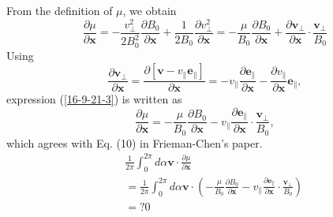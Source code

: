 \documentclass{article}
\begin{document}
From the definition of $\mu$, we obtain
\begin{equation}
  \label{16-9-21-3} \frac{\partial \mu}{\partial \mathbf{x}} = -
  \frac{v_{\perp}^2}{2 B^2_0} \frac{\partial B_0}{\partial \mathbf{x}} +
  \frac{1}{2 B_0}  \frac{\partial v_{\perp}^2}{\partial \mathbf{x}} = -
  \frac{\mu}{B_0}  \frac{\partial B_0}{\partial \mathbf{x}} + \frac{\partial
  \mathbf{v}_{\perp}}{\partial \mathbf{x}} \cdot
  \frac{\mathbf{v}_{\perp}}{B_0}
\end{equation}
Using
\begin{equation}
  \frac{\partial \mathbf{v}_{\perp}}{\partial \mathbf{x}} = \frac{\partial
  [\mathbf{v}- v_{\parallel} \mathbf{e}_{\parallel}]}{\partial \mathbf{x}} = -
  v_{\parallel} \frac{\partial \mathbf{e}_{\parallel}}{\partial \mathbf{x}} -
  \frac{\partial v_{\parallel}}{\partial \mathbf{x}} \mathbf{e}_{\parallel},
\end{equation}
expression (\ref{16-9-21-3}) is written as
\begin{equation}
  \frac{\partial \mu}{\partial \mathbf{x}} = - \frac{\mu}{B_0}  \frac{\partial
  B_0}{\partial \mathbf{x}} - v_{\parallel} \frac{\partial
  \mathbf{e}_{\parallel}}{\partial \mathbf{x}} \cdot
  \frac{\mathbf{v}_{\perp}}{B_0},
\end{equation}
which agrees with Eq. (10) in Frieman-Chen's paper{\cite{frieman1982}}.
\begin{eqnarray*}
  &  & \frac{1}{2 \pi} \int_0^{2 \pi} d \alpha \mathbf{v} \cdot
  \frac{\partial \mu}{\partial \mathbf{x}}\\
  &  & = \frac{1}{2 \pi} \int_0^{2 \pi} d \alpha \mathbf{v} \cdot \left( -
  \frac{\mu}{B_0}  \frac{\partial B_0}{\partial \mathbf{x}} - v_{\parallel}
  \frac{\partial \mathbf{e}_{\parallel}}{\partial \mathbf{x}} \cdot
  \frac{\mathbf{v}_{\perp}}{B_0} \right)\\
  &  & = ? 0
\end{eqnarray*}
\end{document}
